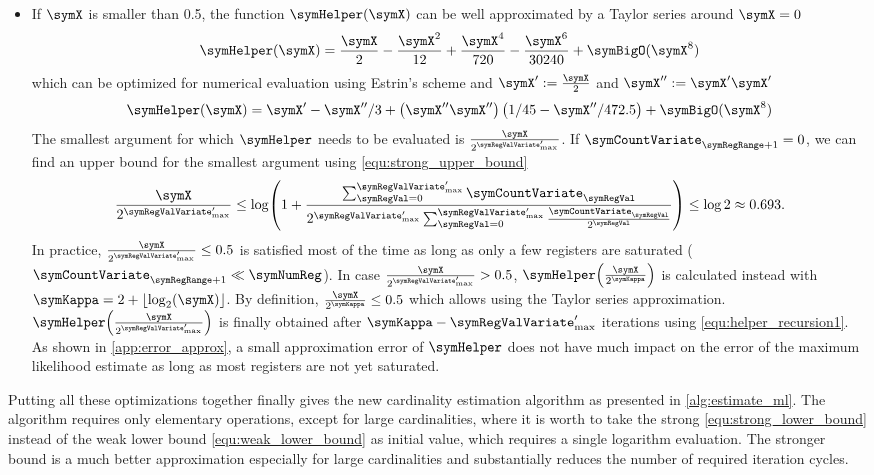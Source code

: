 \documentclass[a4paper]{scrartcl}
\begin{document}
\begin{itemize}
\item If $\symX$ is smaller than 0.5, the function $\symHelper(\symX)$ can be well approximated by a Taylor series around $\symX=0$
\begin{equation}
\symHelper(\symX)
=
\frac{\symX}{2} - \frac{\symX^2}{12} +\frac{\symX^4}{720}-\frac{\symX^6}{30240} + \symBigO(\symX^{8})
\end{equation}
which can be optimized for numerical evaluation using Estrin's scheme and $\symX' := \frac{\symX}{2}$ and $\symX'' := \symX' \symX'$
\begin{equation}
\label{equ:taylor}
\symHelper(\symX)
=
\symX' - \symX''/3 + \left(\symX'' \symX''\right)\left(1/45-\symX''/472.5\right)
+ \symBigO(\symX^{8})
\end{equation}
The smallest argument for which $\symHelper$ needs to be evaluated is $\frac{\symX}{2^{\symRegValVariate'_\text{max}}}$. If 
$\symCountVariate_{\symRegRange+1}=0$, we can find an upper bound for the smallest argument using \eqref{equ:strong_upper_bound}
\begin{equation}
\frac{\symX}{2^{\symRegValVariate'_\text{max}}} 
\leq
\log\!\left(
1+
\frac{\sum_{\symRegVal=0}^{\symRegValVariate'_\text{max}}\symCountVariate_\symRegVal}
{
2^{\symRegValVariate'_\text{max}}
\sum_{\symRegVal=0}^{\symRegValVariate'_\text{max}}
\frac{\symCountVariate_\symRegVal}{2^\symRegVal}
}
\right)
\leq \log 2 \approx 0.693.
\end{equation}
In practice, $\frac{\symX}{2^{\symRegValVariate'_\text{max}}}\leq0.5$ is satisfied most of the time as long as only a few registers are saturated ($\symCountVariate_{\symRegRange+1}\ll \symNumReg$). In case $\frac{\symX}{2^{\symRegValVariate'_\text{max}}} > 0.5$, $\symHelper\!\left(\frac{\symX}{2^{\symKappa}}\right)$ is calculated instead with $\symKappa = 2+\lfloor\log_2(\symX)\rfloor$. By definition, $\frac{\symX}{2^{\symKappa}}\leq 0.5$ which allows using the Taylor series approximation. $\symHelper\!\left(\frac{\symX}{2^{\symRegValVariate'_\text{max}}}\right)$ is finally obtained after $\symKappa -\symRegValVariate'_\text{max}$ iterations using \eqref{equ:helper_recursion1}. As shown in \cref{app:error_approx}, a small approximation error of $\symHelper$ does not have much impact on the error of the maximum likelihood estimate as long as most registers are not yet saturated.
\end{itemize}

Putting all these optimizations together finally gives the new cardinality estimation algorithm as presented in \cref{alg:estimate_ml}. The algorithm requires only elementary operations, except for large cardinalities, where it is worth to take the strong \eqref{equ:strong_lower_bound} instead of the weak lower bound \eqref{equ:weak_lower_bound} as initial value, which requires a single logarithm evaluation. The stronger bound is a much better approximation especially for large cardinalities and substantially reduces the number of required iteration cycles.
\end{document}
